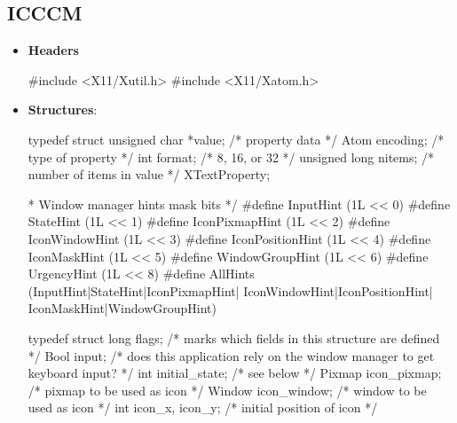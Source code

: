 \documentclass{report}
\begin{document}
    \subsection{ICCCM}
    \begin{itemize}
        \item \textbf{Headers}
            \bigbreak \noindent 
            \begin{cppcode}
            #include <X11/Xutil.h>
            #include <X11/Xatom.h>
            \end{cppcode}
        \item \textbf{Structures}:
            \bigbreak \noindent 
            \begin{cppcode}
                typedef struct {
                    unsigned char *value;       /* property data */
                    Atom encoding;              /* type of property */
                    int format;                 /* 8, 16, or 32 */
                    unsigned long nitems;       /* number of items in value */
                } XTextProperty;
            \end{cppcode}
            \begin{cppcode}
                * Window manager hints mask bits */
                #define InputHint               (1L << 0)
                #define StateHint               (1L << 1)
                #define IconPixmapHint          (1L << 2)
                #define IconWindowHint          (1L << 3)
                #define IconPositionHint        (1L << 4)
                #define IconMaskHint            (1L << 5)
                #define WindowGroupHint         (1L << 6)
                #define UrgencyHint             (1L << 8)
                #define AllHints                (InputHint|StateHint|IconPixmapHint|
                                                IconWindowHint|IconPositionHint|
                                                IconMaskHint|WindowGroupHint)
            \end{cppcode}
            \begin{cppcode}
                typedef struct {
                    long flags;                 /* marks which fields in this structure are defined */
                    Bool input;                 /* does this application rely on the window manager to get keyboard input? */
                    int initial_state;          /* see below */
                    Pixmap icon_pixmap;         /* pixmap to be used as icon */
                    Window icon_window;         /* window to be used as icon */
                    int icon_x, icon_y;         /* initial position of icon */
}
\end{cppcode}
\end{itemize}
\end{document}
